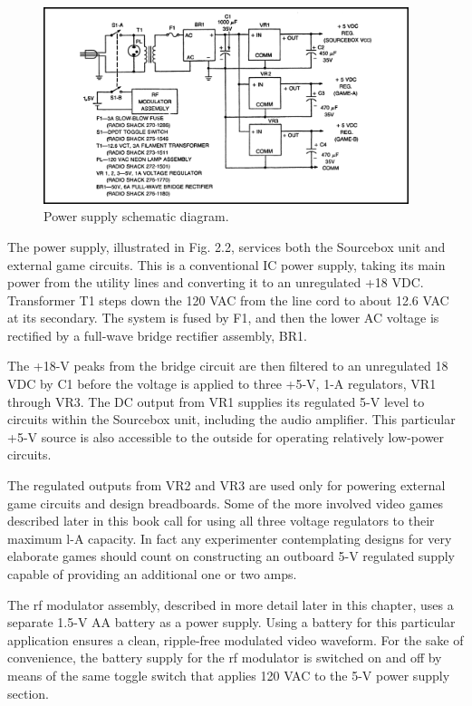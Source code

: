 \documentclass[11pt]{book}              %
\begin{document}
\begin{figure}
  \centering
  \includegraphics[width=0.95\textwidth]{images/fig2-2}
  \caption{Power supply schematic diagram.
}
\end{figure}

The power supply, illustrated in Fig. 2.2, services both the Sourcebox unit and external game circuits. This is a conventional IC power supply, taking its main power from the utility lines and converting it to an unregulated +18 VDC. Transformer T1 steps down the 120 VAC from the line cord to about 12.6 VAC at its secondary. The system is fused by F1, and then the lower AC voltage is rectified by a full-wave bridge rectifier assembly, BR1.

The +18-V peaks from the bridge circuit are then filtered to an unregulated 18 VDC by C1 before the voltage is applied to three +5-V, 1-A regulators, VR1 through VR3. The DC output from VR1 supplies its regulated 5-V level to circuits within the Sourcebox unit, including the audio amplifier. This particular +5-V source is also accessible to the outside for operating relatively low-power circuits.

The regulated outputs from VR2 and VR3 are used only for powering external game circuits and design breadboards. Some of the more involved video games described later in this book call for using all three voltage regulators to their maximum l-A capacity. In fact any experimenter contemplating designs for very elaborate games should count on constructing an outboard 5-V regulated supply capable of providing an additional one or two amps.

The rf modulator assembly, described in more detail later in this chapter, uses a separate 1.5-V AA battery as a power supply. Using a battery for this particular application ensures a clean, ripple-free modulated video waveform. For the sake of convenience, the battery supply for the rf modulator is switched on and off by means of the same toggle switch that applies 120 VAC to the 5-V power supply section.
\end{document}
